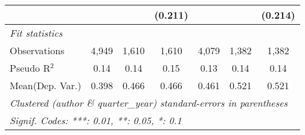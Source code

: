 \begin{tabular}{lcccccc}
                           &         &         & (0.211) &               &                & (0.214)\\   
   \midrule
   \emph{Fit statistics}\\
   Observations            & 4,949   & 1,610   & 1,610   & 4,079         & 1,382          & 1,382\\  
   Pseudo R$^2$            & 0.14    & 0.14    & 0.15    & 0.13          & 0.14           & 0.14\\  
Mean(Dep. Var.) & 0.398 & 0.466 & 0.466 & 0.461 & 0.521 & 0.521 \\
   \midrule \midrule
   \multicolumn{7}{l}{\emph{Clustered (author \& quarter\_year) standard-errors in parentheses}}\\
   \multicolumn{7}{l}{\emph{Signif. Codes: ***: 0.01, **: 0.05, *: 0.1}}\\
\end{tabular}
\par\endgroup
